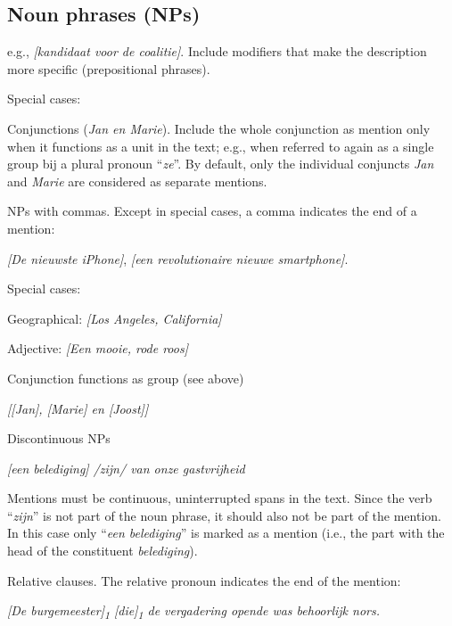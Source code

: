 \subsection{Noun phrases (NPs)}

e.g., \emph{[kandidaat voor de coalitie]}. Include modifiers that
make the description more specific (prepositional phrases).

Special cases:
\begin{itemize*}
\item Conjunctions (\emph{Jan en Marie}). Include the whole conjunction as
  mention only when it functions as a unit in the text;
  e.g., when referred to again as a single group bij a plural pronoun ``\emph{ze}''.
  By default, only the individual conjuncts \emph{Jan} and \emph{Marie} are
  considered as separate mentions.
\item NPs with commas.
    Except in special cases, a comma indicates the end of a mention:

    \emph{[De nieuwste iPhone]}, \emph{[een revolutionaire nieuwe smartphone]}.

    Special cases:
    \begin{itemize*}
        \item Geographical: \emph{{[}Los Angeles, California{]}}
        \item Adjective: \emph{{[}Een mooie, rode roos{]}}
        \item Conjunction functions as group (see above)
        
          \emph{{[}{[}Jan{]}, {[}Marie{]} en {[}Joost{]}{]}}
          
    \end{itemize*}

\item Discontinuous NPs

  \emph{\n{[}[een belediging] /zijn/ van onze gastvrijheid\n{]}}
  
    Mentions must be continuous, uninterrupted spans in the text.
    Since the verb ``\emph{zijn}'' is not part of the noun phrase,
    it should also not be part of the mention.
    In this case only ``\emph{een belediging}'' is marked as a mention
    (i.e., the part with the head of the constituent \emph{belediging}).

\item Relative clauses.
    The relative pronoun indicates the end of the mention:
  
    \emph{\n{[}[De burgemeester]\textsubscript{1} {[}die{]}\textsubscript{1} de vergadering opende\n{]} was behoorlijk nors.}

\end{itemize*}


